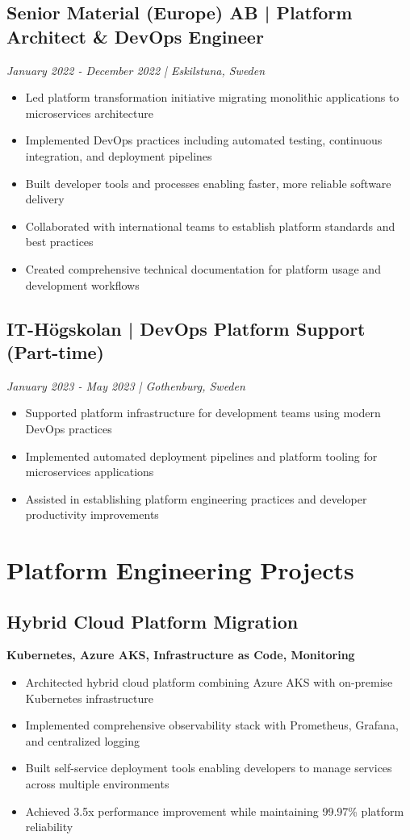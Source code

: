 \documentclass[11pt,a4paper]{article}
\begin{document}
\subsection*{Senior Material (Europe) AB | Platform Architect \& DevOps Engineer}
\textit{January 2022 - December 2022 | Eskilstuna, Sweden}
\begin{itemize}[noitemsep]
\item Led platform transformation initiative migrating monolithic applications to microservices architecture
\item Implemented DevOps practices including automated testing, continuous integration, and deployment pipelines
\item Built developer tools and processes enabling faster, more reliable software delivery
\item Collaborated with international teams to establish platform standards and best practices
\item Created comprehensive technical documentation for platform usage and development workflows
\end{itemize}

\subsection*{IT-Högskolan | DevOps Platform Support (Part-time)}
\textit{January 2023 - May 2023 | Gothenburg, Sweden}
\begin{itemize}[noitemsep]
\item Supported platform infrastructure for development teams using modern DevOps practices
\item Implemented automated deployment pipelines and platform tooling for microservices applications
\item Assisted in establishing platform engineering practices and developer productivity improvements
\end{itemize}

\section*{Platform Engineering Projects}

\subsection{Hybrid Cloud Platform Migration}
\textbf{Kubernetes, Azure AKS, Infrastructure as Code, Monitoring}
\begin{itemize}[noitemsep]
  \item Architected hybrid cloud platform combining Azure AKS with on-premise Kubernetes infrastructure
  \item Implemented comprehensive observability stack with Prometheus, Grafana, and centralized logging
  \item Built self-service deployment tools enabling developers to manage services across multiple environments
  \item Achieved 3.5x performance improvement while maintaining 99.97\% platform reliability
\end{itemize}
\end{document}
